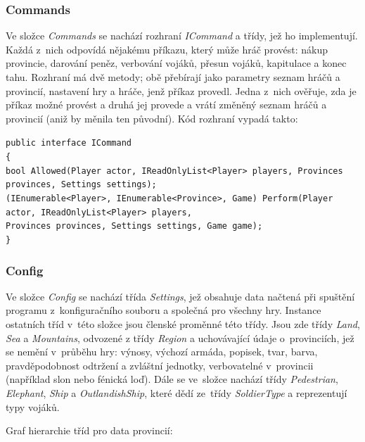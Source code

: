\documentclass[a4paper,12pt]{article}
\def\keyword #1{\color{keyword}#1\color{black}}
\begin{document}
\subsubsection{Commands}
Ve složce \textit{Commands} se nachází rozhraní \textit{ICommand} a třídy, jež ho implementují. Každá z~nich odpovídá nějakému příkazu, který může hráč provést: nákup provincie, darování peněz, verbování vojáků, přesun vojáků, kapitulace a konec tahu. Rozhraní má dvě metody; obě přebírají jako parametry seznam hráčů a provincií, nastavení hry a hráče, jenž příkaz provedl. Jedna z~nich ověřuje, zda je příkaz možné provést a druhá jej provede a vrátí změněný seznam hráčů a provincií (aniž by měnila ten původní). Kód rozhraní vypadá takto:

\scriptsize\selectfont
\texttt{\keyword{public interface }ICommand}\\
\texttt{\{}\\
\hspace*{8mm}\texttt{\keyword{bool }Allowed(Player actor, IReadOnlyList<Player> players, Provinces provinces, Settings settings);}\\
\hspace*{8mm}\texttt{(IEnumerable<Player>, IEnumerable<Province>, Game) Perform(Player actor, IReadOnlyList<Player> players,}\\
\hspace*{48mm}\texttt{Provinces provinces, Settings settings, Game game);}\\
\texttt{\}}\normalsize

\subsubsection{Config}
Ve složce \textit{Config} se nachází třída \textit{Settings}, jež obsahuje data načtená při spuštění programu z~konfiguračního souboru a společná pro všechny hry. Instance ostatních tříd v~této složce jsou členské proměnné této třídy. Jsou zde třídy \textit{Land}, \textit{Sea} a \textit{Mountains}, odvozené z třídy \textit{Region} a uchovávající údaje o~provinciích, jež se nemění v~průběhu hry: výnosy, výchozí armáda, popisek, tvar, barva, pravděpodobnost odtržení a zvláštní jednotky, verbovatelné v~provincii (například slon nebo fénická loď). Dále se ve~složce nachází třídy \textit{Pedestrian}, \textit{Elephant}, \textit{Ship} a \textit{OutlandishShip}, které dědí ze~třídy \textit{SoldierType} a reprezentují typy vojáků.

Graf hierarchie tříd pro data provincií:
\end{document}
